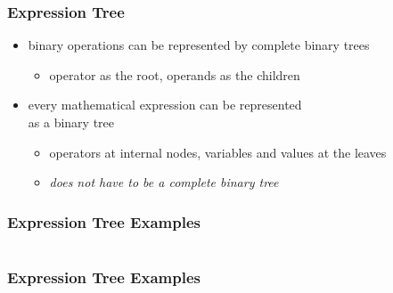 \documentclass[dvipsnames]{beamer}
\begin{document}
\begin{frame}
  \frametitle{Expression Tree}

  \begin{itemize}
    \item binary operations can be represented by complete binary trees
    \begin{itemize}
      \item operator as the root, operands as the children
    \end{itemize}

    \pause
    \medskip
    \item every mathematical expression can be represented\\
      as a binary tree
    \begin{itemize}
      \item operators at internal nodes, variables and values at the leaves
      \item \emph{does not have to be a complete binary tree}
    \end{itemize}
  \end{itemize}
\end{frame}

\begin{frame}
  \frametitle{Expression Tree Examples}

  \begin{columns}[t]
    \begin{example}[$7-a$]
      \begin{center}
      \end{center}
    \end{example}

    \begin{example}[$a+b$]
      \begin{center}
      \end{center}
    \end{example}
  \end{columns}
\end{frame}

\begin{frame}
  \frametitle{Expression Tree Examples}

  \begin{columns}[t]
    \begin{example}[$(7-a)/5$]
      \begin{center}
      \end{center}
    \end{example}

    \begin{example}[$(a+b) \uparrow 3$]
      \begin{center}
      \end{center}
    \end{example}
  \end{columns}
\end{frame}
\end{document}
